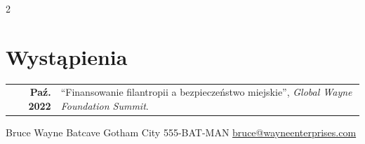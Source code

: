 \documentclass[darkhipster]{simplehipstercv}
\newlength{\rightcolwidth}
\begin{document}
\begin{paracol}{2}
\begin{minipage}[t]{0.3\textwidth}
\section*{Wystąpienia}
\begin{tabular}{>{\footnotesize\bfseries}r >{\footnotesize}p{}}
    Paź. 2022 & ``Finansowanie filantropii a bezpieczeństwo miejskie'', \emph{Global Wayne Foundation Summit}.
\end{tabular}
\end{minipage}






\vfill{} %

\setlength{\parindent}{0pt}
\begin{minipage}[t]{\rightcolwidth}
\begin{center}\fontfamily{\sfdefault}\selectfont \color{black!70}
{\small Bruce Wayne  Batcave  Gotham City  555-BAT-MAN \newline{} \protect\url{bruce@wayneenterprises.com}
}
\end{center}
\end{minipage}

\end{paracol}
\end{document}
